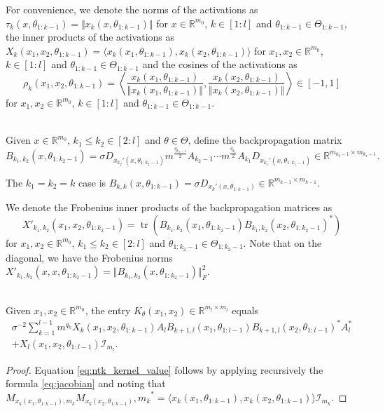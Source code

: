 \documentclass[twoside,11pt]{article}
\newcommand{\R}{\mathbb{R}}
\newcommand{\Id}{\mathcal{I}}
\DeclareMathOperator{\tr}{tr}
\begin{document}
For convenience, we denote the norms of the activations as $\tau_k(x,\theta_{1:k-1}) = \Vert x_k(x, \theta_{1 : k-1}) \Vert$ for $x \in \R^{m_0}$, $k \in [1:l]$ and $\theta_{1 : k-1} \in \Theta_{1 : k-1}$, the inner products of the activations as $X_k(x_1,x_2,\theta_{1:k-1}) = \langle x_k(x_1, \theta_{1 : k-1}), x_k(x_2, \theta_{1 : k-1}) \rangle$ for $x_1,x_2 \in \R^{m_0}$, $k \in [1:l]$ and $\theta_{1 : k-1} \in \Theta_{1 : k-1}$ and the cosines of the activations as
\[
\rho_k(x_1,x_2,\theta_{1:k-1}) = \left\langle \frac{x_k(x_1, \theta_{1 : k-1})}{\Vert x_k(x_1, \theta_{1 : k-1}) \Vert}, \frac{x_k(x_2, \theta_{1 : k-1})}{\Vert x_k(x_2, \theta_{1 : k-1}) \Vert} \right\rangle \in [-1,1]
\]
for $x_1,x_2 \in \R^{m_0}$, $k \in [1:l]$ and $\theta_{1 : k-1} \in \Theta_{1 : k-1}$.

\begin{definition}\label{def:backprop_matrix}~\\
Given $x \in \R^{m_0}$, $k_1 \leq k_2 \in [2:l]$ and $\theta \in \Theta$, define the backpropagation matrix
\[
B_{k_1, k_2}(x, \theta_{1 : k_2-1})
= \sigma D_{x_{k_2}'(x,\theta_{1 : k_2-1})} m^{\frac{q_{k_2-1}}{2}} A_{k_2-1} \cdots m^{\frac{q_{k_1}}{2}} A_{k_1} D_{x_{k_1}'(x,\theta_{1 : k_1-1})} \in \R^{m_{k_2-1} \times m_{k_1-1}}.
\]
\end{definition}
The $k_1=k_2=k$ case is $B_{k, k}(x, \theta_{1 : k-1}) = \sigma D_{x_k'(x,\theta_{1 : k-1})} \in \R^{m_{k-1} \times m_{k-1}}$.

We denote the Frobenius inner products of the backpropagation matrices as
\[
X'_{k_1,k_2}(x_1,x_2,\theta_{1:k_2-1}) = \tr(B_{k_1, k_2}(x_1, \theta_{1 : k_2-1}) B_{k_1, k_2}(x_2, \theta_{1 : k_2-1})^*)
\]
for $x_1,x_2 \in \R^{m_0}$, $k_1 \leq k_2 \in [2:l]$ and $\theta_{1 : k_2-1} \in \Theta_{1 : k_2-1}$. Note that on the diagonal, we have the Frobenius norms $X'_{k_1,k_2}(x,x,\theta_{1:k_2-1}) = \Vert B_{k_1, k_2}(x, \theta_{1 : k_2-1}) \Vert_F^2$.

\begin{proposition}\label{prop:ntk_kernel_expression}~\\
Given $x_1, x_2 \in \R^{m_0}$, the entry $K_\theta(x_1,x_2) \in \R^{m_l \times m_l}$ equals
\begin{multline}\label{eq:ntk_kernel_value}
\sigma^{-2} \sum_{k=1}^{l-1} m^{q_k} X_k(x_1,x_2, \theta_{1:k-1}) A_l B_{k+1,l}(x_1, \theta_{1 : l-1}) {B_{k+1,l}(x_2, \theta_{1 : l-1})}^* A_l^* \\
+ X_l(x_1,x_2,\theta_{1:l-1}) \Id_{m_l}.
\end{multline}
\end{proposition}
\begin{proof}
Equation \eqref{eq:ntk_kernel_value} follows by applying recursively the formula \eqref{eq:jacobian} and noting that $M_{x_k(x_1, \theta_{1:k-1}),m_k} {M_{x_k(x_2, \theta_{1:k-1})},m_k}^* = \langle x_k(x_1, \theta_{1:k-1}), x_k(x_2, \theta_{1:k-1}) \rangle \Id_{m_k}$.
\end{proof}
\end{document}
